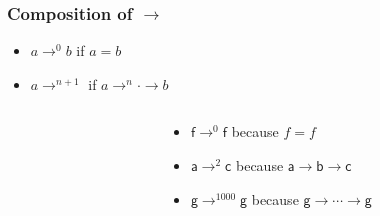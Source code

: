 \documentclass[12pt,aspectratio=169]{beamer}
\newcommand{\m}[1]{\mathsf{#1}}
\begin{document}
\begin{frame}
    \frametitle{Composition of $\rightarrow$}
    \begin{definition}
        \begin{itemize}
            \item \alert{$a \rightarrow^{0} b$} if $a = b$
            \item \alert{$a \rightarrow^{n+1}$} if $a \rightarrow^{n} \cdot \rightarrow b$
        \end{itemize}
    \end{definition}

    \begin{example}
        \begin{columns}
        \begin{column}{0.35\textwidth}
            \centering
            \fig
        \end{column}
        \begin{column}{0.5\textwidth}
            \begin{itemize}
                \item $\m{f} \rightarrow^{0} \m{f}$ because $f=f$
                \item $\m{a} \rightarrow^{2} \m{c}$ because $\m{a} \rightarrow \m{b} \rightarrow \m{c}$
                \item $\m{g} \rightarrow^{1000} \m{g}$ because $\m{g}\rightarrow \cdots \rightarrow \m{g}$
            \end{itemize}
        \end{column}
        \end{columns}
    \end{example}
\end{frame}
\end{document}
